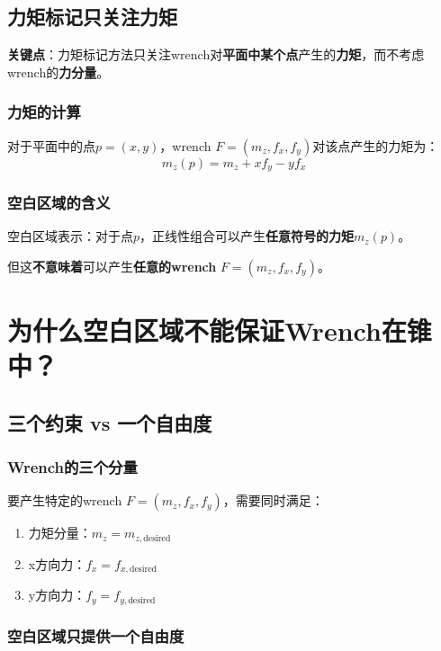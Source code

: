 \documentclass[12pt,a4paper]{article}
\begin{document}
\subsection{力矩标记只关注力矩}

\textbf{关键点}：力矩标记方法只关注wrench对\textbf{平面中某个点}产生的\textbf{力矩}，而不考虑wrench的\textbf{力分量}。

\subsubsection{力矩的计算}

对于平面中的点$p = (x, y)$，wrench $F = (m_z, f_x, f_y)$对该点产生的力矩为：
\begin{equation}
m_z(p) = m_z + x f_y - y f_x
\end{equation}

\subsubsection{空白区域的含义}

空白区域表示：对于点$p$，正线性组合可以产生\textbf{任意符号的力矩}$m_z(p)$。

但这\textbf{不意味着}可以产生\textbf{任意的wrench} $F = (m_z, f_x, f_y)$。

\section{为什么空白区域不能保证Wrench在锥中？}

\subsection{三个约束 vs 一个自由度}

\subsubsection{Wrench的三个分量}

要产生特定的wrench $F = (m_z, f_x, f_y)$，需要同时满足：
\begin{enumerate}
    \item 力矩分量：$m_z = m_{z,\text{desired}}$
    \item x方向力：$f_x = f_{x,\text{desired}}$
    \item y方向力：$f_y = f_{y,\text{desired}}$
\end{enumerate}

\subsubsection{空白区域只提供一个自由度}
\end{document}
